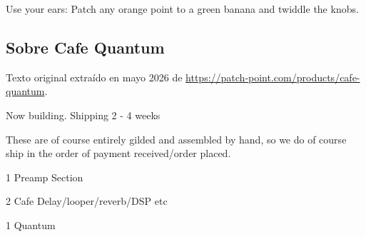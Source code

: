 Use your ears: Patch any orange point to a green banana and twiddle the knobs.

\newpage

\subsection{Sobre Cafe Quantum}

Texto original extraído en mayo 2026 de \url{https://patch-point.com/products/cafe-quantum}.

Now building.  Shipping 2 - 4 weeks 

These are of course entirely gilded and assembled by hand, so we do of course ship in the order of payment received/order placed. 

1 Preamp Section

2 Cafe Delay/looper/reverb/DSP etc

1 Quantum